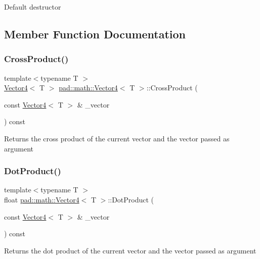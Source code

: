 Default destructor 

\subsection{Member Function Documentation}
\mbox{\label{structpad_1_1math_1_1_vector4_a46ae48163a69e577092edb42b67ae84d}} 
\subsubsection{\texorpdfstring{Cross\+Product()}{CrossProduct()}}
{\footnotesize\ttfamily template$<$typename T $>$ \\
\mbox{\hyperlink{structpad_1_1math_1_1_vector4}{Vector4}}$<$ T $>$ \mbox{\hyperlink{structpad_1_1math_1_1_vector4}{pad\+::math\+::\+Vector4}}$<$ T $>$\+::Cross\+Product (\begin{DoxyParamCaption}\item[{const \mbox{\hyperlink{structpad_1_1math_1_1_vector4}{Vector4}}$<$ T $>$ \&}]{\+\_\+vector }\end{DoxyParamCaption}) const}

Returns the cross product of the current vector and the vector passed as argument \mbox{\label{structpad_1_1math_1_1_vector4_aa2bc23659e5331ea63c4135ff4ba0cc5}} 
\subsubsection{\texorpdfstring{Dot\+Product()}{DotProduct()}}
{\footnotesize\ttfamily template$<$typename T $>$ \\
float \mbox{\hyperlink{structpad_1_1math_1_1_vector4}{pad\+::math\+::\+Vector4}}$<$ T $>$\+::Dot\+Product (\begin{DoxyParamCaption}\item[{const \mbox{\hyperlink{structpad_1_1math_1_1_vector4}{Vector4}}$<$ T $>$ \&}]{\+\_\+vector }\end{DoxyParamCaption}) const}

Returns the dot product of the current vector and the vector passed as argument \mbox{\label{structpad_1_1math_1_1_vector4_a60b73d235abc2a5948dccbe786de338f}} 

